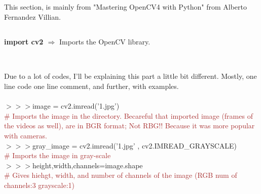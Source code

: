 \documentclass[a4paper,18pt]{article}
\begin{document}

\newpage

\section{\colorbox {Abi}{}}
This section, is mainly from "Mastering OpenCV4 with Python" from Alberto Fernandez Villian.
\subsection{\colorbox {matgreen}{\color{white}{\large import cv2}}}
\textbf{import cv2 $\Rightarrow$} Imports the OpenCV library.\\\\


\subsection{\colorbox {matgreen}{\color{white}{\large Primary Works on Image}}}
Due to a lot of codes, I'll be explaining this part a little bit different. Mostly, one line code one line comment, and further, with examples.\\\\


$>>>$image = cv2.imread('1.jpg')\\{\textcolor{brown}{\# Imports the image in the directory. Becareful that imported image (frames of the videos as well), are in BGR format; Not RBG!! Because it was more popular with cameras.}}\\

$>>>$gray\_image = cv2.imread('1.jpg' , cv2.IMREAD\_GRAYSCALE)\\{\textcolor{brown}{\# Imports the image in gray-scale}}\\

$>>>$height,width,channels=image.shape\\{\textcolor{brown}{\# Gives hiehgt, width, and number of channels of the image (RGB num of channels:3 grayscale:1)}}\\
\end{document}
